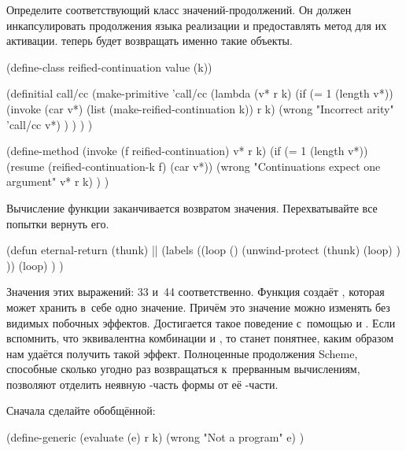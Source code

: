 
Определите соответствующий класс значений-продолжений. Он должен инкапсулировать
продолжения языка реализации и предоставлять метод для их активации.
 теперь будет возвращать именно такие объекты.

\begin{code:lisp}
(define-class reified-continuation value (k))

(definitial call/cc
  (make-primitive 'call/cc
   (lambda (v* r k)
     (if (= 1 (length v*))
         (invoke (car v*) (list (make-reified-continuation k)) r k)
         (wrong "Incorrect arity" 'call/cc v*) ) ) ) )

(define-method (invoke (f reified-continuation) v* r k)
  (if (= 1 (length v*))
      (resume (reified-continuation-k f) (car v*))
      (wrong "Continuations expect one argument" v* r k) ) )
\end{code:lisp}



Вычисление функции заканчивается возвратом значения. Перехватывайте все попытки
вернуть его.

\begin{code:lisp}
(defun eternal-return (thunk)     |\dialect{\CommonLisp}|
  (labels ((loop ()
             (unwind-protect (thunk)
               (loop) ) ))
    (loop) ) )
\end{code:lisp}



Значения этих выражений: 33 и~44 соответственно. Функция  создаёт
, которая может хранить в~себе одно значение. Причём это значение
можно изменять без видимых побочных эффектов. Достигается такое поведение
с~помощью  и . Если вспомнить, что 
эквивалентна комбинации  и , то станет понятнее, каким образом
нам удаётся получить такой эффект. Полноценные продолжения Scheme, способные
сколько угодно раз возвращаться к~прерванным вычислениям, позволяют отделить
неявную -часть формы  от её -части.



Сначала сделайте  обобщённой:

\begin{code:lisp}
(define-generic (evaluate (e) r k)
  (wrong "Not a program" e) )
\end{code:lisp}

